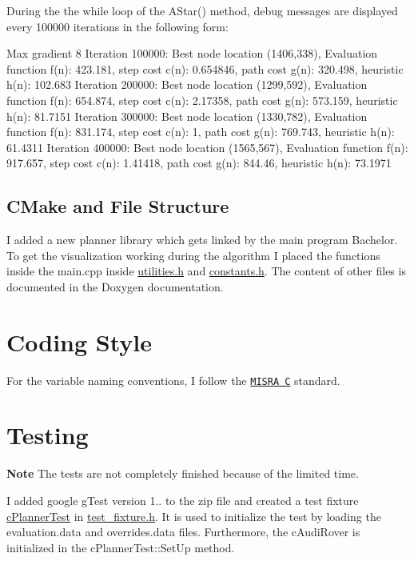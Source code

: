 During the the while loop of the A\+Star() method, debug messages are displayed every 100000 iterations in the following form\+:


\begin{DoxyCode}
Max gradient 8
Iteration 100000: Best node location (1406,338), 
     Evaluation function f(n): 423.181, step cost c(n): 0.654846, path cost g(n): 320.498, heuristic h(n):
       102.683
Iteration 200000: Best node location (1299,592), 
     Evaluation function f(n): 654.874, step cost c(n): 2.17358, path cost g(n): 573.159, heuristic h(n):
       81.7151
Iteration 300000: Best node location (1330,782), 
     Evaluation function f(n): 831.174, step cost c(n): 1, path cost g(n): 769.743, heuristic h(n): 61.4311
Iteration 400000: Best node location (1565,567), 
     Evaluation function f(n): 917.657, step cost c(n): 1.41418, path cost g(n): 844.46, heuristic h(n):
       73.1971
\end{DoxyCode}


\subsection*{C\+Make and File Structure}

I added a new planner library which gets linked by the main program Bachelor. To get the visualization working during the algorithm I placed the functions inside the main.\+cpp inside \mbox{\hyperlink{utilities_8h_source}{utilities.\+h}} and \mbox{\hyperlink{constants_8h_source}{constants.\+h}}. The content of other files is documented in the Doxygen documentation. ~\newline


\section*{Coding Style}

For the variable naming conventions, I follow the \href{https://en.wikipedia.org/wiki/MISRA_C}{\tt M\+I\+S\+RA C} standard.

\section*{Testing}

{\bfseries Note} The tests are not completely finished because of the limited time.

I added google g\+Test version 1.. to the zip file and created a test fixture \mbox{\hyperlink{classc_planner_test}{c\+Planner\+Test}} in \mbox{\hyperlink{test__fixture_8h_source}{test\+\_\+fixture.\+h}}. It is used to initialize the test by loading the evaluation.\+data and overrides.\+data files. Furthermore, the c\+Audi\+Rover is initialized in the c\+Planner\+Test\+::\+Set\+Up method.

